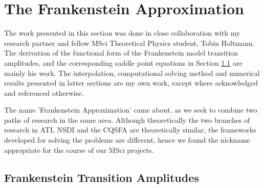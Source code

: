\documentclass[11pt]{article}
\numberwithin{equation}{section}
\begin{document}
\section{The Frankenstein Approximation}
The work presented in this section was done in close collaboration with my research partner and fellow MSci Theoretical Physics student, Tobin Holtmann. The derivation of the functional form of the Frankenstein model transition amplitudes, and the corresponding saddle point equations in Section \ref{ch:FEA} are mainly his work. The interpolation, computational solving method and numerical results presented in latter sections are my own work, except where acknowledged and referenced otherwise.
\par
The name 'Frankenstein Approximation' came about, as we seek to combine two paths of research in the same area. Although theoretically the two branches of research in ATI, NSDI and the CQSFA are theoretically similar, the frameworks developed for solving the problems are different, hence we found the nickname appropriate for the course of our MSci projects.

\subsection{Frankenstein Transition Amplitudes} \label{ch:FEA}
\end{document}
